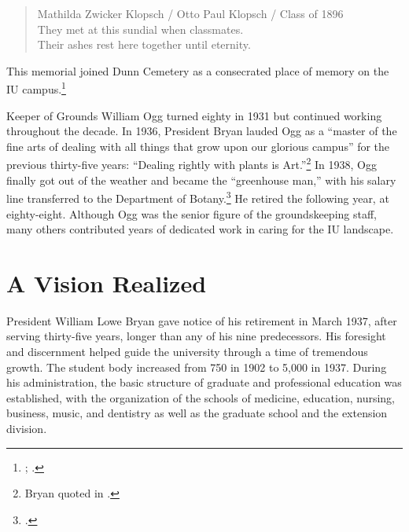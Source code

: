 \documentclass[
  american,
  letterpaper,
]{scrreprt}
\begin{document}
\begin{quote}
Mathilda Zwicker Klopsch / Otto Paul Klopsch / Class of 1896\\
They met at this sundial when classmates.\\
Their ashes rest here together until eternity.
\end{quote}

This memorial joined Dunn Cemetery as a consecrated place of memory on
the IU campus.\footnote{;
  .}

Keeper of Grounds William Ogg turned eighty in 1931 but continued
working throughout the decade. In 1936, President Bryan lauded Ogg as a
``master of the fine arts of dealing with all things that grow upon our
glorious campus'' for the previous thirty-five years: ``Dealing rightly
with plants is Art.''\footnote{Bryan quoted in
  .} In 1938, Ogg finally got out of the weather and became the
``greenhouse man,'' with his salary line transferred to the Department
of Botany.\footnote{.}
He retired the following year, at eighty-eight. Although Ogg was the
senior figure of the groundskeeping staff, many others contributed years
of dedicated work in caring for the IU landscape.

\section{A Vision Realized}\label{a-vision-realized}

President William Lowe Bryan gave notice of his retirement in March
1937, after serving thirty-five years, longer than any of his nine
predecessors. His foresight and discernment helped guide the university
through a time of tremendous growth. The student body increased from 750
in 1902 to 5,000 in 1937. During his administration, the basic structure
of graduate and professional education was established, with the
organization of the schools of medicine, education, nursing, business,
music, and dentistry as well as the graduate school and the extension
division.
\end{document}
